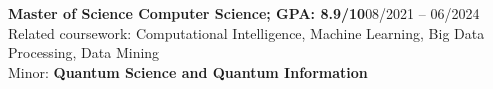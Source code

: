     {\textbf{Master of Science Computer Science;  GPA: 8.9/10}}{08/2021 -- 06/2024}
    \small{Related coursework: Computational Intelligence, Machine Learning, Big Data Processing, Data Mining}\\
    
    \small{Minor: \textbf{Quantum Science and Quantum Information}}\\
